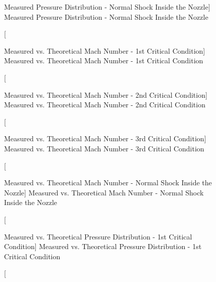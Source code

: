 \begin{figure}[htpb]
    \centering
     
     \caption
     [Measured Pressure Distribution - Normal Shock Inside the Nozzle]
     {Measured Pressure Distribution - Normal Shock Inside the Nozzle}
     \label{fig: MeasuredPressureDistributionNormalShockInsidetheNozzle}
\end{figure}

\begin{figure}[htpb]
    \centering
     
     \caption
     [Measured vs. Theoretical Mach Number - 1st Critical Condition]
     {Measured vs. Theoretical Mach Number - 1st Critical Condition}
     \label{fig: MeasuredvsTheoreticalMachNumber1stCriticalCondition}
\end{figure}

\begin{figure}[htpb]
    \centering
     
     \caption
     [Measured vs. Theoretical Mach Number - 2nd Critical Condition]
     {Measured vs. Theoretical Mach Number - 2nd Critical Condition}
     \label{fig: MeasuredvsTheoreticalMachNumber2ndCriticalCondition}
\end{figure}

\begin{figure}[htpb]
    \centering
     
     \caption
     [Measured vs. Theoretical Mach Number - 3rd Critical Condition]
     {Measured vs. Theoretical Mach Number - 3rd Critical Condition}
     \label{fig: MeasuredvsTheoreticalMachNumber3rdCriticalCondition}
\end{figure}

\begin{figure}[htpb]
    \centering
     
     \caption
     [Measured vs. Theoretical Mach Number - Normal Shock Inside the Nozzle]
     {Measured vs. Theoretical Mach Number - Normal Shock Inside the Nozzle}
     \label{fig: MeasuredvsTheoreticalMachNumberNormalShockInsidetheNozzle}
\end{figure}

\begin{figure}[htpb]
    \centering
     
     \caption
     [Measured vs. Theoretical Pressure Distribution - 1st Critical Condition]
     {Measured vs. Theoretical Pressure Distribution - 1st Critical Condition}
     \label{fig: MeasuredvsTheoreticalPressureDistribution1stCriticalCondition}
\end{figure}

